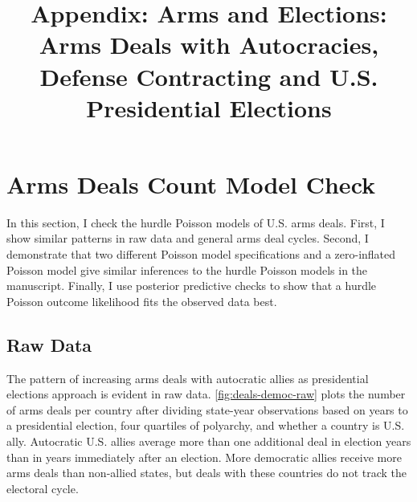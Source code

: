 \documentclass[12pt]{article}
\title{\textbf{Appendix: Arms and Elections: Arms Deals with Autocracies, Defense Contracting and U.S. Presidential Elections}}
\date{}
\begin{document}
\maketitle 

\singlespace 

\tableofcontents

\bigskip





\section{Arms Deals Count Model Check}

In this section, I check the hurdle Poisson models of U.S. arms deals. 
First, I show similar patterns in raw data and general arms deal cycles. 
Second, I demonstrate that two different Poisson model specifications and a zero-inflated Poisson model give similar inferences to the hurdle Poisson models in the manuscript. 
Finally, I use posterior predictive checks to show that a hurdle Poisson outcome likelihood fits the observed data best. 


\subsection{Raw Data}

The pattern of increasing arms deals with autocratic allies as presidential elections approach is evident in raw data.
\autoref{fig:deals-democ-raw} plots the number of arms deals per country after dividing state-year observations based on years to a presidential election, four quartiles of polyarchy, and whether a country is U.S. ally.
Autocratic U.S. allies average more than one additional deal in election years than in years immediately after an election. 
More democratic allies receive more arms deals than non-allied states, but deals with these countries do not track the electoral cycle. 
\end{document}
